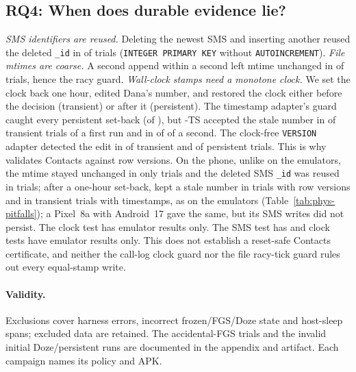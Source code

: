\subsection{RQ4: When does durable evidence lie?}
\label{sec:eval-pitfalls}

\emph{SMS identifiers are reused.} Deleting the newest SMS and inserting another reused the deleted \texttt{\_id} in \SmsReuseK of \SmsReuseN trials (\texttt{INTEGER PRIMARY KEY} without \texttt{AUTOINCREMENT}).
\emph{File mtimes are coarse.} A second append within a second left mtime unchanged in \MtimeSameK of \MtimeN trials, hence the racy guard.
\emph{Wall-clock stamps need a monotone clock.} We set the clock back one hour, edited Dana's number, and restored the clock either before the decision (transient) or after it (persistent). The timestamp adapter's guard caught every persistent set-back (\ClockTsPersistentGuard of \ClockTsPersistentN), but \stamp-TS accepted the stale number in \ClockTsTransientStale of \ClockTsTransientN transient trials of a first run and in \ClockVtwoTsTransientStale of \ClockVerTransientN of a second. The clock-free \texttt{VERSION} adapter detected the edit in \ClockVerTransientDet of \ClockVerTransientN transient and \ClockVerPersistentDet of \ClockVerPersistentN persistent trials. This is why \stamp validates Contacts against row versions. On the phone, unlike on the emulators, the mtime stayed unchanged in only \PhysMtimeSame trials\ifPhysSms{} and the deleted SMS \texttt{\_id} was reused in \PhysSmsReuse trials\fi\ifPhysClock; after a one-hour set-back, \stamp kept a stale number in \PhysClockStale trials with row versions and in \PhysClockTsTransientStale transient trials with timestamps, as on the emulators\fi{} (Table~\ref{tab:phys-pitfalls}); a Pixel~8a with Android~17 gave the same, but its SMS writes did not persist.\ifPhysSms\ifPhysClock\else{} The clock test has emulator results only.\fi\else{} The SMS\ifPhysClock{} test has\else{} and clock tests have\fi{} emulator results only.\fi{} This does not establish a reset-safe Contacts certificate, and neither the call-log clock guard nor the file racy-tick guard rules out every equal-stamp write.

\paragraph{Validity.} Exclusions cover harness errors, incorrect frozen/FGS/Doze state and host-sleep spans; excluded data are retained. The \ETwoFgsLeftover accidental-FGS trials and the invalid initial Doze/persistent runs are documented in the appendix and artifact. Each campaign names its policy and APK.

